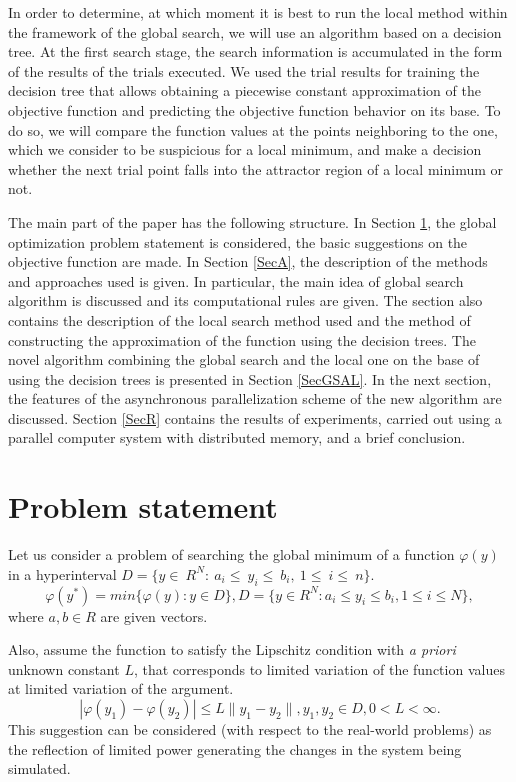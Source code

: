 \documentclass{cmi}
\begin{document}
In order to determine,  at which moment it is best to run the local method within the framework of the  global search, we will use an algorithm based on a decision tree. At the first search stage, the search information is accumulated in the form of the results of the trials  executed. We used the trial results for training the decision tree that allows obtaining a piecewise constant approximation of the objective function and predicting the objective function behavior on its base.  To do so, we will compare the function values at the points neighboring to the one, which we consider  to be suspicious for a local minimum, and make a decision  whether the next trial point falls into the attractor region of a local minimum or not.

The main part of the paper has the following structure.  In Section \ref{SecPS}, the global optimization problem statement is considered, the basic suggestions  on the objective function are made. In Section \ref{SecA}, the description of the methods and approaches used is given. In particular, the main idea of global search algorithm is discussed and its computational rules are given. The section also contains the description of the local search method used and the method of constructing the approximation of the function using the decision trees. The novel algorithm combining the global search and the local one on the base of using the decision  trees is presented in Section \ref{SecGSAL}. In the next section,  the features of the asynchronous parallelization scheme of the new algorithm are discussed. Section \ref{SecR} contains the results of experiments, carried out using a parallel computer system  with distributed memory, and a brief conclusion.


\section{Problem statement}\label{SecPS}

Let us consider a problem of searching the global minimum of a function $\varphi(y)$ in a hyperinterval  $D=\{ y\in\ R^N:\ a_i\le\ y_i\le\ b_i,\ 1\le\ i\le\ n \}$. 
\begin{equation} \label{sec:problem}   
	\varphi(y^*) = min\{\varphi(y):y\in D\}, D = \{y \in R^N : a_i \leq y_i \leq b_i, 1 \leq i \leq N \},
\end{equation}
where $a,b \in R$ are given vectors.

Also, assume the function to satisfy the Lipschitz condition with \textit{a priori} unknown constant $L$, that corresponds to limited variation of the function values at limited variation of the argument.   
\begin{displaymath} 
	|\varphi(y_1)-\varphi(y_2)|\leq L\parallel y_1-y_2 \parallel ,y_1,y_2 \in D, 0<L< \infty. 
\end{displaymath}
This suggestion can be considered (with respect to the real-world problems) as the reflection of limited  power generating the changes in the system being simulated.
\end{document}
